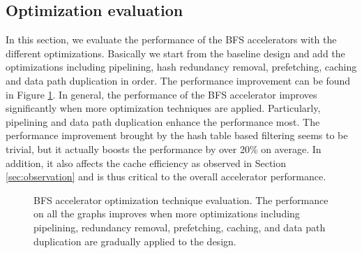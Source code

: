 \subsection{Optimization evaluation}
In this section, we evaluate the 
performance of the BFS accelerators with the different optimizations. 
Basically we start from the baseline design and 
add the optimizations including pipelining, hash redundancy removal, 
prefetching, caching and data path duplication in order. The performance improvement 
can be found in Figure \ref{fig:opt-performance}. 
In general, the performance of the BFS accelerator improves 
significantly when more optimization techniques are applied. Particularly,
pipelining and data path duplication enhance the performance most. 
The performance improvement brought by the hash table based filtering 
seems to be trivial, but it actually boosts the performance by over 20\% on average. 
In addition, it also affects the cache efficiency as observed in Section \ref{sec:observation}
and is thus critical to the overall accelerator performance.

\begin{figure}
    \caption{BFS accelerator optimization technique evaluation. The performance on 
    all the graphs improves when more optimizations including pipelining, 
    redundancy removal, prefetching, caching, and data path duplication are 
    gradually applied to the design.}
\label{fig:opt-performance}
\vspace{-1em}
\end{figure}

